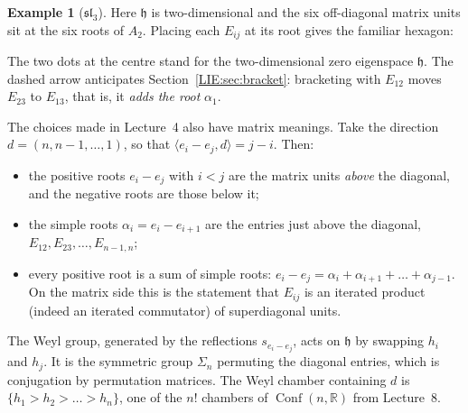 \documentclass[11pt,openany]{book}
\theoremstyle{plain}
\theoremstyle{definition}
\newtheorem{example}[theorem]{Example}
\theoremstyle{remark}
\newcommand{\R}{\mathbb{R}}
\newcommand{\Conf}{\operatorname{Conf}}
\newcommand{\ip}[2]{\langle #1, #2\rangle}
\begin{document}
\begin{example}[$\mathfrak{sl}_3$]\label{LIE:ex:sl3}
Here $\mathfrak h$ is two-dimensional and the six off-diagonal matrix units sit at the six roots of
$A_2$. Placing each $E_{ij}$ at its root gives the familiar hexagon:
\begin{center}
\end{center}
The two dots at the centre stand for the two-dimensional zero eigenspace $\mathfrak h$. The dashed
arrow anticipates Section~\ref{LIE:sec:bracket}: bracketing with $E_{12}$ moves $E_{23}$ to $E_{13}$,
that is, it \emph{adds the root} $\alpha_1$.
\end{example}

The choices made in Lecture~4 also have matrix meanings. Take the direction $d=(n,n-1,\dots,1)$, so
that $\ip{e_i-e_j}{d}=j-i$. Then:
\begin{itemize}
\item the positive roots $e_i-e_j$ with $i<j$ are the matrix units \emph{above} the diagonal, and
  the negative roots are those below it;
\item the simple roots $\alpha_i=e_i-e_{i+1}$ are the entries just above the diagonal,
  $E_{12},E_{23},\dots,E_{n-1,n}$;
\item every positive root is a sum of simple roots: $e_i-e_j=\alpha_i+\alpha_{i+1}+\dots+\alpha_{j-1}$.
  On the matrix side this is the statement that $E_{ij}$ is an iterated product (indeed an iterated
  commutator) of superdiagonal units.
\end{itemize}
The Weyl group, generated by the reflections $s_{e_i-e_j}$, acts on $\mathfrak h$ by swapping $h_i$ and
$h_j$. It is the symmetric group $\Sigma_n$ permuting the diagonal entries, which is conjugation by
permutation matrices. The Weyl chamber containing $d$ is $\{h_1>h_2>\dots>h_n\}$, one of the $n!$
chambers of $\Conf(n,\R)$ from Lecture~8.
\end{document}
